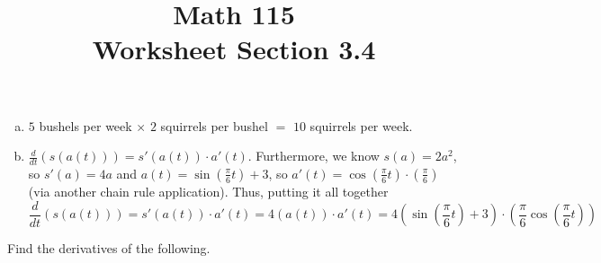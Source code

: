 \documentclass[11pt]{exam}
\title{\vspace{-0.5in} Math 115 \\ Worksheet Section 3.4}
\date{}
\begin{document}
\maketitle
\vspace{-0.75in}
\begin{questions}
  \question
    \begin{solution}
      \begin{enumerate}[(a)]
      \item \(5\) bushels per week \(\times\) \(2\) squirrels per
        bushel \(=\) \(10\) squirrels per week.
      \item \(\frac{d}{dt}(s(a(t))) = s'(a(t)) \cdot
        a'(t)\). Furthermore, we know \(s(a) = 2a^2\), so \(s'(a) =
        4a\) and \(a(t) = \sin\left( \frac{\pi}{6}t \right)+3\), so
        \(a'(t) = \cos\left( \frac{\pi}{6}t \right)\cdot \left(
          \frac{\pi}{6} \right)\) (via another chain rule
        application). Thus, putting it all together \[
\frac{d}{dt}(s(a(t))) = s'(a(t)) \cdot
        a'(t) = 4(a(t)) \cdot a'(t) = 4\left( \sin\left(
            \frac{\pi}{6}t \right)+3 \right) \cdot \left(\frac{\pi}{6}\cos\left( \frac{\pi}{6}t \right) \right)
        \]
      \end{enumerate}
    \end{solution}
\question Find the derivatives of the following.
\end{questions}
\end{document}
